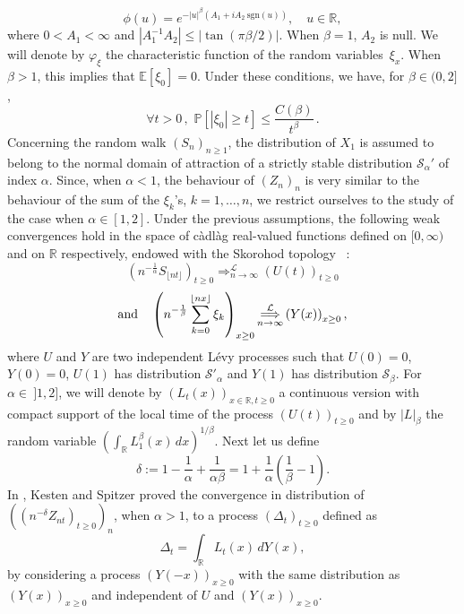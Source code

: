 \documentclass[oneside, a4paper,11pt,reqno]{amsart}
\begin{document}
\begin{equation}\label{FC}
\phi(u)=e^{-|u|^\beta(A_1+i A_2\  \text{sgn}(u))},\quad u\in\mathbb{R},
\end{equation}
where $0<A_1<\infty$ and $ |A_1^{-1}A_2|\le |\tan (\pi\beta/2)|$. When $\beta=1$, $A_2$ is null.
We will denote by $\varphi_\xi$ the characteristic function of the random variables~$\xi_x$. 
When $\beta > 1$, this implies that ${\mathbb{E}}[\xi_0] = 0$. 
Under these conditions, we have, for $\beta \in (0,2]$, 
\begin{equation}
\label{queue}
\forall t > 0 \, , \,\, {\mathbb{P}} {\left[ {{ {\left| {{\xi_0}} \right|} \ge t}} \right]} \le \frac{C(\beta)}{t^{\beta}} \, .
\end{equation}
Concerning the random walk $(S_n)_{n\geq1}$,  the distribution of $X_1$ 
is assumed to belong to the normal
domain of attraction of a strictly stable distribution  $\mathcal{S}_{\alpha}'$ of 
index $\alpha$. Since, when $\alpha<1$, the behaviour of $(Z_n)_n$ is
very similar to the behaviour of the sum of the $\xi_k$'s, $k=1,\ldots,n$, we restrict ourselves to the study
of the case when $\alpha\in [1,2]$. 
Under the previous assumptions, the following weak convergences hold in the space  of 
c\`adl\`ag real-valued functions 
defined on $[0,\infty)$ and on $\mathbb R$ respectively,  endowed with the 
Skorohod topology ~:
$$\left(n^{-\frac{1}{\alpha}} S_{\lfloor nt\rfloor}\right)_{t\geq 0}   
\mathop{\Longrightarrow}_{n\rightarrow\infty}
^{\mathcal{L}} \left(U(t)\right)_{t\geq 0}$$
$$\mbox{\rm and} \  \  \   \left(n^{-\frac{1}{\beta}} 
\sum_{k=0}^{\lfloor nx\rfloor}\xi_{k }\right)_{x\ge 0}
   \mathop{\Longrightarrow}_{n\rightarrow\infty}^{\mathcal{L}} 
\left(Y(x)\right)_{x\ge 0},$$
where $U$ and $Y$ are two independent L\'evy processes such 
that $U(0)=0$, $Y(0)=0$, 
$U(1)$ has distribution $\mathcal{S}'_{\alpha}$ and $Y(1)$ 
has distribution  $\mathcal{S}_\beta$. 
For $\alpha\in\ ]1,2]$, we will denote by $(L_t(x))_{x\in\mathbb{R},t\geq 0}$ a continuous version with compact support of the local time of the process
 $(U(t))_{t\geq 0}$ and  by $|L|_\beta$ the random variable $\left( \int_{\mathbb R} L_1^
 \beta (x)\, d x \right)^{1/\beta} $. Next let us define 
\begin{equation} 
\label{def-delta}
\delta:=1-\frac 1\alpha+\frac 1{\alpha\beta} = 1 + \frac 1\alpha(\frac{1}{\beta}-1).
\end{equation}
In \cite{KestenSpitzer}, Kesten and Spitzer proved 
the convergence in distribution of $((n^{-\delta} Z_{nt})_{t\ge 0})_n$, when $\alpha>1$, 
to a process $(\Delta_t)_{t\geq 0}$ defined as
$$\Delta_t = \int_{\mathbb{R}} L_t(x) \, dY(x),$$
by considering a process $(Y(-x))_{x\ge 0}$ with the same distribution
as $(Y(x))_{x\ge 0}$ and independent of $U$ and $(Y(x))_{x\ge 0}$.
\end{document}
